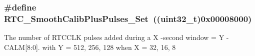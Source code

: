 \subsubsection[{R\+T\+C\+\_\+\+Smooth\+Calib\+Plus\+Pulses\+\_\+\+Set}]{\setlength{\rightskip}{0pt plus 5cm}\#define R\+T\+C\+\_\+\+Smooth\+Calib\+Plus\+Pulses\+\_\+\+Set~((uint32\+\_\+t)0x00008000)}\label{group___r_t_c___smooth__calib___plus__pulses___definitions_ga48a2b554e653139e8fda1d4ffd470144}
The number of R\+T\+C\+C\+L\+K pulses added during a X -\/second window = Y -\/ C\+A\+L\+M\mbox{[}8\+:0\mbox{]}. with Y = 512, 256, 128 when X = 32, 16, 8 